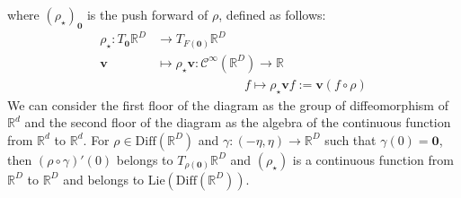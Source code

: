 \vspace{0.4cm}

where $(\rho_{\star})_{\mathbf{0}}$ is the push forward of $\rho$, defined as follows: 
\begin{align*}
\rho_{\star} : T_{\mathbf{0}} \mathbb{R}^{D} & \longrightarrow  T_{F(\mathbf{0})}\mathbb{R}^{D}   
\\
\mathbf{v}  &\longmapsto  \rho_{\star} \mathbf{v}  : \mathcal{C}^{\infty}(\mathbb{R}^{D})  \longrightarrow   \mathbb{R} 
\\
& \qquad \qquad \qquad \quad f \longmapsto \rho_{\star} \mathbf{v}f 
:= 
\mathbf{v}(f\circ \rho) 
\end{align*}
We can consider the first floor of the diagram as the group of diffeomorphism of $\mathbb{R}^{d}$ and the second floor of the diagram as the algebra of  the continuous function from $\mathbb{R}^{d}$ to $\mathbb{R}^{d}$. 
For $\rho \in \text{Diff}(\mathbb{R}^{D})$ and $\gamma : (-\eta,\eta) \rightarrow \mathbb{R}^{D}$ such that $\gamma(0) = \mathbf{0}$, then $(\rho\circ \gamma)'(0)$ belongs to $T_{\rho(\mathbf{0})}\mathbb{R}^{D}$ and $(\rho_{\star})$ is a continuous function from $\mathbb{R}^{D}$ to $\mathbb{R}^{D}$ and belongs to $\text{Lie}(\text{Diff}(\mathbb{R}^{D}))$.


